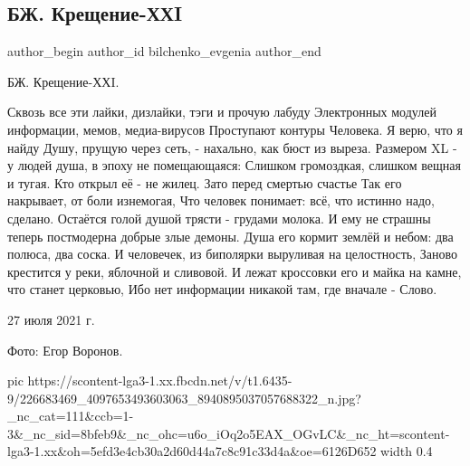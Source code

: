  
 
 
 
 
 
\subsection{БЖ. Крещение-ХХI}
\label{sec:27_07_2021.fb.bilchenko_evgenia.1.kreschenie_xxi}
 
\ifcmt
 author_begin
   author_id bilchenko_evgenia
 author_end
\fi

БЖ. Крещение-ХХI.

\obeycr
Сквозь все эти лайки, дизлайки, тэги и прочую лабуду
Электронных модулей информации, мемов, медиа-вирусов
Проступают контуры Человека. Я верю, что я найду
Душу, прущую через сеть, - нахально, как бюст из выреза.
\smallskip
Размером XL - у людей душа, в эпоху не помещающаяся:
Слишком громоздкая, слишком вещная и тугая.
Кто открыл её - не жилец. Зато перед смертью счастье
Так его накрывает, от боли изнемогая,
\smallskip
Что человек понимает: всё, что истинно надо, сделано.
Остаётся голой душой трясти - грудами молока.
И ему не страшны теперь постмодерна добрые злые демоны.
Душа его кормит землёй и небом: два полюса, два соска.
\smallskip
И человечек, из биполярки выруливая на целостность,
Заново крестится у реки, яблочной и сливовой.
И лежат кроссовки его и майка на камне, что станет церковью,
Ибо нет информации никакой там, где вначале - Слово.
\restorecr

27 июля 2021 г. 

Фото: Егор Воронов.

\ifcmt
  pic https://scontent-lga3-1.xx.fbcdn.net/v/t1.6435-9/226683469_4097653493603063_8940895037057688322_n.jpg?_nc_cat=111&ccb=1-3&_nc_sid=8bfeb9&_nc_ohc=u6o_iOq2o5EAX_OGvLC&_nc_ht=scontent-lga3-1.xx&oh=5efd3e4cb30a2d60d44a7c8c91c33d4a&oe=6126D652
  width 0.4
\fi


